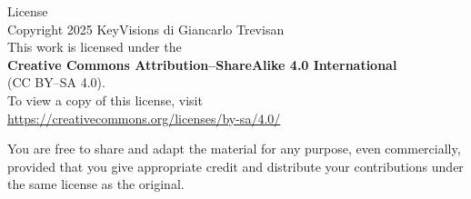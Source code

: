 \cleardoublepage
\thispagestyle{empty}
\begin{center}
{\Large License}\\[1.25em]
Copyright \textcopyright{} 2025 KeyVisions\texttrademark{} di Giancarlo Trevisan\\[0.75em]
This work is licensed under the\\
{\bfseries Creative Commons Attribution--ShareAlike 4.0 International}\\
(CC BY--SA 4.0).\\[0.75em]
To view a copy of this license, visit\\
\url{https://creativecommons.org/licenses/by-sa/4.0/}
\end{center}

\vfill
\noindent You are free to share and adapt the material for any purpose, even commercially, provided that you give appropriate credit and distribute your contributions under the same license as the original.
